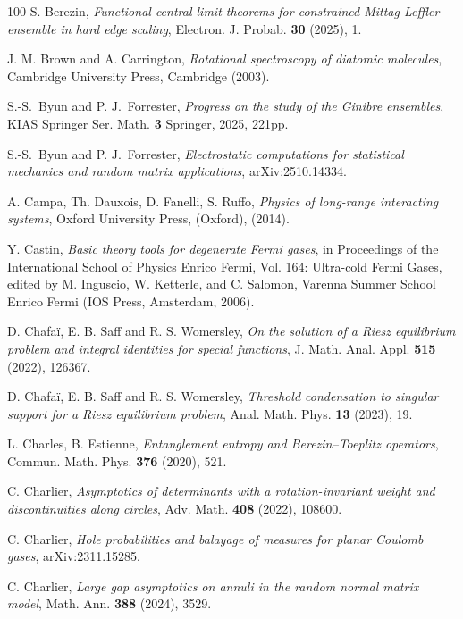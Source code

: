 \documentclass[10pt]{amsart}
\theoremstyle{plain}
\theoremstyle{remark}
\numberwithin{equation}{section}
\begin{document}
\begin{thebibliography}{100}
 S. Berezin, \emph{Functional central limit theorems for constrained Mittag-Leffler ensemble in hard edge scaling}, Electron. J. Probab. \textbf{30} (2025), 1.%

 J. M. Brown and A. Carrington, {\it Rotational spectroscopy of diatomic molecules}, Cambridge University Press, Cambridge (2003).

 S.-S.~Byun and P. J.~Forrester, \emph{Progress on the study of the Ginibre ensembles}, KIAS Springer Ser. Math. \textbf{3} Springer, 2025, 221pp. 

 S.-S.~Byun and P. J.~Forrester, \emph{Electrostatic computations for statistical mechanics and random matrix applications}, arXiv:2510.14334.


A. Campa, Th. Dauxois, D. Fanelli, S. Ruffo, {\it Physics of long-range interacting systems}, Oxford University Press, (Oxford), (2014).

 Y. Castin, \emph{Basic theory tools for degenerate Fermi gases}, in Proceedings of the International
School of Physics Enrico Fermi, Vol. 164: Ultra-cold Fermi Gases, edited by M. Inguscio, W. Ketterle, and C. Salomon, Varenna Summer School Enrico Fermi (IOS Press, Amsterdam, 2006).



 D. Chafaï, E. B. Saff and R. S. Womersley, \emph{On the solution of a Riesz equilibrium problem and integral identities for special functions}, J. Math. Anal. Appl. \textbf{515} (2022), 126367.

 D. Chafaï, E. B. Saff and R. S. Womersley, \emph{Threshold condensation to singular support for a Riesz equilibrium problem}, Anal. Math. Phys. \textbf{13} (2023), 19.


L. Charles, B. Estienne, {\it Entanglement entropy and Berezin–Toeplitz operators}, Commun. Math. Phys. {\bf 376} (2020), 521.


 C. Charlier, \emph{Asymptotics of determinants with a rotation-invariant weight and discontinuities along circles}, Adv. Math. \textbf{408} (2022), 108600.

 C. Charlier, \emph{Hole probabilities and balayage of measures for planar Coulomb gases}, arXiv:2311.15285. 

 C. Charlier, \emph{Large gap asymptotics on annuli in the random normal matrix model}, Math. Ann. \textbf{388} (2024), 3529.%



\end{thebibliography}
\end{document}
